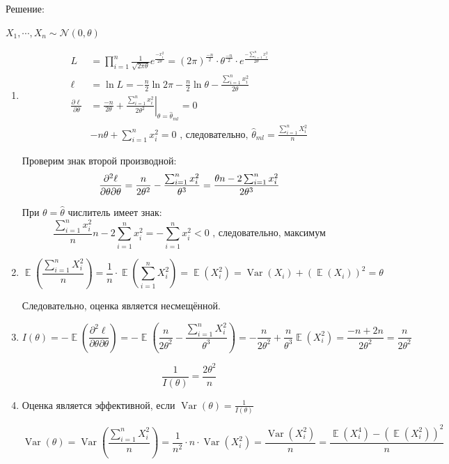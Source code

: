 \documentclass[a4paper,11pt]{article}
\DeclareMathOperator{\Var}{Var}
\DeclareMathOperator{\E}{\mathbb{E}}
\newcommand{\cN}{\mathcal{N}}
\begin{document}
\begin{enumerate}
Решение:

$X_1, \cdots , X_n \sim \cN(0, \theta)$
\begin{enumerate}
\item
\begin{align*}
L &= \prod_{i=1}^n \frac{1}{\sqrt{2\pi \theta}} e^{\frac{- x_i^2}{2\theta}} = (2\pi)^{\frac{-n}{2}} \cdot \theta^{\frac{-n}{2}} \cdot e^{\frac{-\sum_{i=1}^n x_i^2}{2\theta}} \\
\ell &= \ln L = -\frac{n}{2} \ln 2\pi - \frac{n}{2} \ln \theta - \frac{\sum_{i=1}^n x_i^2}{2\theta} \\
\frac{\partial \ell}{\partial \theta} &= \left. \frac{-n}{2\theta} + \frac{\sum_{i=1}^n x_i^2}{2\theta^2} \right|_{\theta = \hat \theta_{ml}} = 0 \\
&-n\theta  + \sum_{i=1}^n x_i^2 = 0 \text{ , следовательно, }
\hat{\theta}_{ml} = \frac{\sum_{i=1}^n X_i^2}{n} 
\end{align*}

Проверим знак второй производной:
\[
\frac{\partial^2 \ell}{\partial \theta \partial \theta} = \frac{n}{2\theta^2} - \frac{\sum_{i=1}^n x_i^2}{\theta^3} = \frac{\theta n - 2 \sum_{i=1}^n x_i^2}{2 \theta^3} \\
\]

При $\theta = \hat {\theta}$ числитель имеет знак:
\[
\frac{\sum_{i=1}^n x_i^2}{n}  n - 2\sum_{i=1}^n x_i^2 = -\sum_{i=1}^n x_i^2 < 0 \text{ , следовательно, максимум}
\]

\item

\[
\E \left (\frac{\sum_{i=1}^n X_i^2}{n} \right)= \frac{1}{n} \cdot \E \left (\sum_{i=1}^n X_i^2 \right) = \E (X_i^2) = \Var(X_i) + (\E (X_i))^2 = \theta
\]

Следовательно, оценка является несмещённой.

\item

\[
I(\theta) = -\E \left (\frac{\partial^2 \ell}{\partial \theta \partial \theta} \right) = - \E \left (\frac{n}{2\theta^2} - \frac{\sum_{i=1}^n X_i^2}{\theta^3} \right) = -\frac{n}{2\theta^2} + \frac{n}{\theta^3} \E(X_i^2) = \frac{-n + 2n}{2\theta^2} = \frac{n}{2\theta^2}
\]

\[
\frac{1}{I(\theta)} = \frac{2\theta^2}{n}
\]

\item
 Оценка является эффективной, если $\Var(\theta) = \frac{1}{I(\theta)}$

\[
\Var(\theta) = \Var \left (\frac{\sum_{i=1}^n X_i^2}{n} \right) = \frac{1}{n^2} \cdot n \cdot \Var(X_i^2) = \frac{\Var (X_i^2)}{n} = \frac{\E(X_i^4) - (\E(X_i^2))^2}{n}
\]


\end{enumerate}
\end{enumerate}
\end{document}
